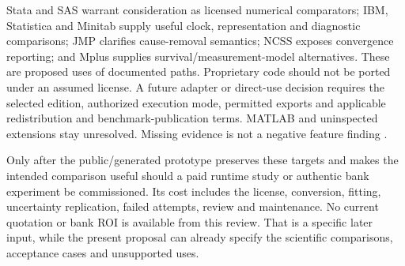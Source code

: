 Stata and SAS warrant consideration as licensed numerical comparators;
IBM, Statistica and Minitab supply useful clock, representation and diagnostic
comparisons; JMP clarifies cause-removal semantics; NCSS exposes convergence
reporting; and Mplus supplies survival/measurement-model alternatives.
These are proposed uses of documented paths. Proprietary code should not be
ported under an assumed license. A future adapter or direct-use decision
requires the selected edition, authorized execution mode, permitted exports
and applicable redistribution and benchmark-publication terms. MATLAB and
uninspected extensions stay unresolved. Missing evidence is not a negative
feature finding \citep{exec14_survival_survey}.

Only after the public/generated prototype preserves these targets and makes
the intended comparison useful should a paid runtime study or authentic bank
experiment be commissioned. Its cost includes the license, conversion,
fitting, uncertainty replication, failed attempts, review and maintenance.
No current quotation or bank ROI is available from this review. That is a
specific later input, while the present proposal can already specify the
scientific comparisons, acceptance cases and unsupported uses.
\label{exec15:commercial-survival-end}
